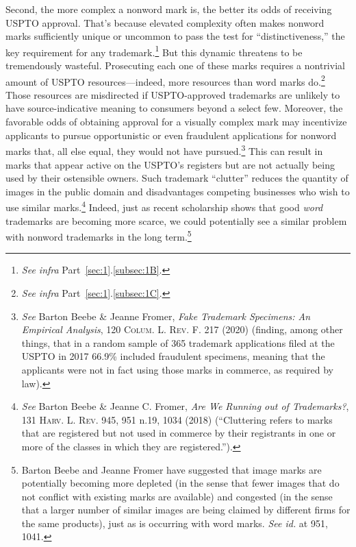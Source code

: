 \documentclass[letterpaper, 11pt, oneside]{article}
\begin{document}
Second, the more complex a nonword mark is, the better its odds of receiving USPTO approval. That's because elevated complexity often makes nonword marks sufficiently unique or uncommon to pass the test for ``distinctiveness,'' the key requirement for any trademark.\footnote{\textit{See infra} Part~\ref{sec:1}.\ref{subsec:1B}.} But this dynamic threatens to be tremendously wasteful. Prosecuting each one of these marks requires a nontrivial amount of USPTO resources—indeed, more resources than word marks do.\footnote{\textit{See infra} Part~\ref{sec:1}.\ref{subsec:1C}.} Those resources are misdirected if USPTO-approved trademarks are unlikely to have source-indicative meaning to consumers beyond a select few. Moreover, the favorable odds of obtaining approval for a visually complex mark may incentivize applicants to pursue opportunistic or even fraudulent applications for nonword marks that, all else equal, they would not have pursued.\footnote{\textit{See} Barton Beebe \& Jeanne Fromer, \textit{Fake Trademark Specimens: An Empirical Analysis}, 120 \textsc{Colum. L. Rev. F.} 217 (2020) (finding, among other things, that in a random sample of 365 trademark applications filed at the USPTO in 2017 66.9\% included fraudulent specimens, meaning that the applicants were not in fact using those marks in commerce, as required by law).} This can result in marks that appear active on the USPTO's registers but are not actually being used by their ostensible owners. Such trademark ``clutter'' reduces the quantity of images in the public domain and disadvantages competing businesses who wish to use similar marks.\footnote{\label{supra4} \textit{See} Barton Beebe \& Jeanne C. Fromer, \textit{Are We Running out of Trademarks?}, 131 \textsc{Harv. L. Rev.} 945, 951 n.19, 1034 (2018) (``Cluttering refers to marks that are registered but not used in commerce by their registrants in one or more of the classes in which they are registered.'').} Indeed, just as recent scholarship shows that good \textit{word} trademarks are becoming more scarce, we could potentially see a similar problem with nonword trademarks in the long term.\footnote{Barton Beebe and Jeanne Fromer have suggested that image marks are potentially becoming more depleted (in the sense that fewer images that do not conflict with existing marks are available) and congested (in the sense that a larger number of similar images are being claimed by different firms for the same products), just as is occurring with word marks. \textit{See id.} at 951, 1041.}
\end{document}

